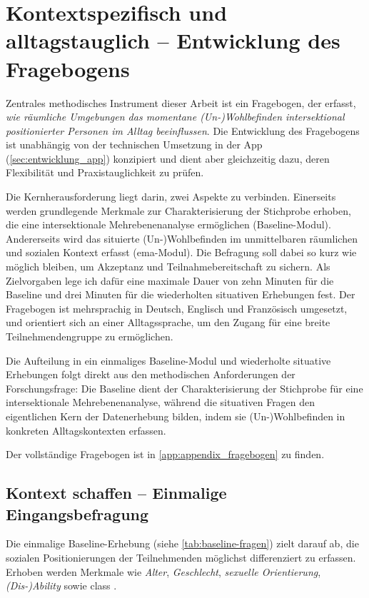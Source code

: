 \chapter{Kontextspezifisch und alltagstauglich -- Entwicklung des Fragebogens}
\label{sec:fragebogenentwicklung}

Zentrales methodisches Instrument dieser Arbeit ist ein Fragebogen, der erfasst, \emph{wie räumliche Umgebungen das momentane (Un\nobreakdash-)Wohl\-be\-find\-en intersektional positionierter Personen im Alltag beeinflussen}. Die Entwicklung des Fragebogens ist unabhängig von der technischen Umsetzung in der App (\cref{sec:entwicklung_app}) konzipiert und dient aber gleichzeitig dazu, deren Flexibilität und Praxistauglichkeit zu prüfen.

Die Kernherausforderung liegt darin, zwei Aspekte zu verbinden. Einerseits werden grundlegende Merkmale zur Charakterisierung der Stichprobe erhoben, die eine intersektionale Mehrebenenanalyse ermöglichen (Baseline-Modul). Andererseits wird das situierte (Un\nobreakdash-)Wohl\-be\-find\-en im unmittelbaren räumlichen und sozialen Kontext erfasst (\gls{ema}-Modul). Die Befragung soll dabei so kurz wie möglich bleiben, um Akzeptanz und Teilnahmebereitschaft zu sichern. Als Zielvorgaben lege ich dafür eine maximale Dauer von zehn Minuten für die Baseline und drei Minuten für die wiederholten situativen Erhebungen fest. Der Fragebogen ist mehrsprachig in Deutsch, Englisch und Französisch umgesetzt, und orientiert sich an einer Alltagssprache, um den Zugang für eine breite Teilnehmendengruppe zu ermöglichen. 

Die Aufteilung in ein einmaliges Baseline-Modul und wiederholte situative Erhebungen folgt direkt aus den methodischen Anforderungen der Forschungsfrage: Die Baseline dient der Charakterisierung der Stichprobe für eine intersektionale Mehrebenenanalyse, während die situativen Fragen den eigentlichen Kern der Datenerhebung bilden, indem sie (Un\nobreakdash-)Wohl\-be\-find\-en in konkreten Alltagskontexten erfassen.

Der vollständige Fragebogen ist in \cref{app:appendix_fragebogen} zu finden.

\section{Kontext schaffen -- Einmalige Eingangsbefragung}

Die einmalige Baseline-Erhebung (siehe \cref{tab:baseline-fragen}) zielt darauf ab, die sozialen Positionierungen der Teilnehmenden möglichst differenziert zu erfassen. Erhoben werden Merkmale wie \emph{Alter}, \emph{Geschlecht}, \emph{sexuelle Orientierung}, \emph{(Dis-)Ability}
sowie \gls{class} \parencite{bauerIntersectionalityQuantitativeResearch2021}.

